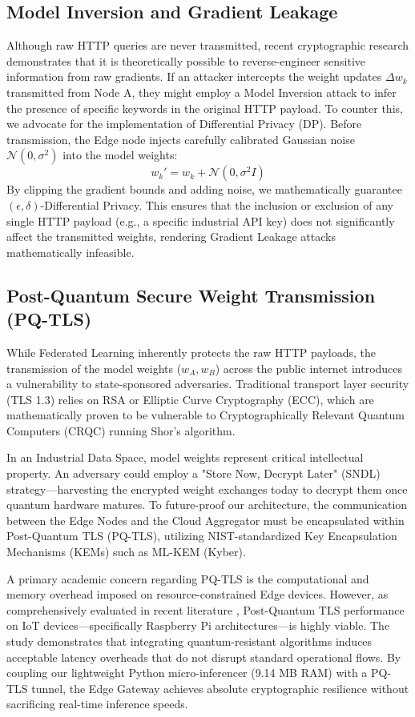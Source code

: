 \documentclass[conference]{IEEEtran}
\begin{document}
\subsection{Model Inversion and Gradient Leakage}
Although raw HTTP queries are never transmitted, recent cryptographic research demonstrates that it is theoretically possible to reverse-engineer sensitive information from raw gradients. If an attacker intercepts the weight updates $\Delta w_k$ transmitted from Node A, they might employ a Model Inversion attack to infer the presence of specific keywords in the original HTTP payload.
To counter this, we advocate for the implementation of Differential Privacy (DP). Before transmission, the Edge node injects carefully calibrated Gaussian noise $\mathcal{N}(0, \sigma^2)$ into the model weights:
\begin{equation}
    w_k' = w_k + \mathcal{N}(0, \sigma^2 I)
\end{equation}
By clipping the gradient bounds and adding noise, we mathematically guarantee $(\epsilon, \delta)$-Differential Privacy. This ensures that the inclusion or exclusion of any single HTTP payload (e.g., a specific industrial API key) does not significantly affect the transmitted weights, rendering Gradient Leakage attacks mathematically infeasible.


\subsection{Post-Quantum Secure Weight Transmission (PQ-TLS)}
While Federated Learning inherently protects the raw HTTP payloads, the transmission of the model weights ($w_A, w_B$) across the public internet introduces a vulnerability to state-sponsored adversaries. Traditional transport layer security (TLS 1.3) relies on RSA or Elliptic Curve Cryptography (ECC), which are mathematically proven to be vulnerable to Cryptographically Relevant Quantum Computers (CRQC) running Shor's algorithm. 

In an Industrial Data Space, model weights represent critical intellectual property. An adversary could employ a "Store Now, Decrypt Later" (SNDL) strategy---harvesting the encrypted weight exchanges today to decrypt them once quantum hardware matures. To future-proof our architecture, the communication between the Edge Nodes and the Cloud Aggregator must be encapsulated within Post-Quantum TLS (PQ-TLS), utilizing NIST-standardized Key Encapsulation Mechanisms (KEMs) such as ML-KEM (Kyber).

A primary academic concern regarding PQ-TLS is the computational and memory overhead imposed on resource-constrained Edge devices. However, as comprehensively evaluated in recent literature \cite{friend_pqtls}, Post-Quantum TLS performance on IoT devices---specifically Raspberry Pi architectures---is highly viable. The study demonstrates that integrating quantum-resistant algorithms induces acceptable latency overheads that do not disrupt standard operational flows. By coupling our lightweight Python micro-inferencer (9.14 MB RAM) with a PQ-TLS tunnel, the Edge Gateway achieves absolute cryptographic resilience without sacrificing real-time inference speeds.
\end{document}
